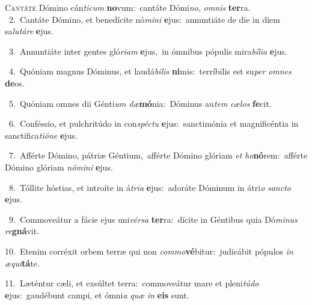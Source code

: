 \lettrine{\initial\textcolor{\initialcolor}{C}}{antáte} Dómino cán\-\textit{ti}\-\textit{cum} \textbf{no}\-vum:~\star cantáte Dómi\-\textit{no}\-, \textit{om}\-\textit{nis} \textbf{ter}\-ra.\\
{\numbfont\textcolor{\numbcolor}{~2.}}~Cantáte Dómino, et benedícite nó\-\textit{mi}\-\textit{ni} \textbf{e}\-jus:~\star annuntiáte de die in diem sa\-\textit{lu}\-\textit{tá}\textit{re} \textbf{e}\-jus.\par
{\numbfont\textcolor{\numbcolor}{~3.}}~Annuntiáte inter gentes gló\-\textit{ri}\-\textit{am} \textbf{e}\-jus,~\star in ómnibus pópulis mira\-\textit{bí}\-\textit{li}\textit{a} \textbf{e}\-jus.\par
{\numbfont\textcolor{\numbcolor}{~4.}}~Quóniam magnus Dóminus, et laudá\-\textit{bi}\-\textit{lis} \textbf{ni}\-mis:~\star terríbilis est su\textit{per} \textit{om}\-\textit{nes} \textbf{de}\-os.\par
{\numbfont\textcolor{\numbcolor}{~5.}}~Quóniam omnes dii Génti\textit{um} \textit{dæ}\-\textbf{mó}nia:~\star Dóminus au\textit{tem} \textit{cæ}\-\textit{los} \textbf{fe}\-cit.\par
{\numbfont\textcolor{\numbcolor}{~6.}}~Conféssio, et pulchritúdo in con\-\textit{spéc}\-\textit{tu} \textbf{e}\-jus:~\star sanctimónia et magnificéntia in sanctifica\-\textit{ti}\-\textit{ó}\textit{ne} \textbf{e}\-jus.\par
{\numbfont\textcolor{\numbcolor}{~7.}}~Afférte Dómino, pátriæ Géntium,~\dagger afférte Dómino glóriam \textit{et} \textit{ho}\-\textbf{nó}rem:~\star afférte Dómino glóriam \textit{nó}\-\textit{mi}\textit{ni} \textbf{e}\-jus.\par
{\numbfont\textcolor{\numbcolor}{~8.}}~Tóllite hóstias, et introíte in á\-\textit{tri}\-\textit{a} \textbf{e}\-jus:~\star adoráte Dóminum in átri\textit{o} \textit{sanc}\-\textit{to} \textbf{e}\-jus.\par
{\numbfont\textcolor{\numbcolor}{~9.}}~Commoveátur a fácie ejus uni\-\textit{vér}\-\textit{sa} \textbf{ter}\-ra:~\star dícite in Géntibus quia Dó\-\textit{mi}\-\textit{nus} \textit{re}\-\textbf{gná}vit.\par
{\numbfont\textcolor{\numbcolor}{10.}}~Etenim corréxit orbem terræ qui non \textit{com}\-\textit{mo}\textbf{vé}bitur:~\star judicábit pópulos \textit{in} \textit{æ}\-\textit{qui}\textbf{tá}te.\par
{\numbfont\textcolor{\numbcolor}{11.}}~Læténtur cæli, et exsúltet terra:~\dagger commoveátur mare et pleni\-\textit{tú}\-\textit{do} \textbf{e}\-jus:~\star gaudébunt campi, et ómni\textit{a} \textit{quæ} \textit{in} \textbf{e}\-\textbf{is} sunt.\par
